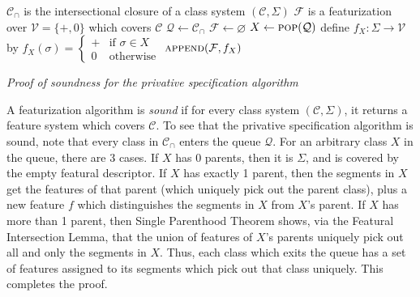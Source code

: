 \documentclass[11pt, oneside]{article}   	%
\begin{document}
\noindent \begin{algorithmic}
    \REQUIRE $\mathcal C_\cap$ is the intersectional closure of a class system $(\mathcal C, \Sigma)$
    \ENSURE $\mathcal F$ is a featurization over $\mathcal V = \{ +, 0 \}$ which covers $\mathcal C$
    \STATE
    \STATE $\mathcal Q \leftarrow \mathcal C_\cap$
    \STATE $\mathcal F \leftarrow \varnothing$
    \STATE
        \STATE $X \leftarrow \textsc{pop}(\mathcal Q)$
            \STATE define $f_X : \Sigma \rightarrow \mathcal V$ by $f_X(\sigma) = \begin{cases}
                + & \mbox{if } \sigma \in X \\
                0 & \mbox{otherwise}
                \end{cases} $
            \STATE $\textsc{append}(\mathcal F, f_X)$
        \ENDIF
    \ENDWHILE
\end{algorithmic}

\vspace{\baselineskip} \noindent \textit{Proof of soundness for the privative specification algorithm}

A featurization algorithm is \textit{sound} if for every class system $(\mathcal C, \Sigma)$, it returns a feature system which covers $\mathcal C$. To see that the privative specification algorithm is sound, note that every class in $\mathcal C_\cap$ enters the queue $\mathcal Q$. For an arbitrary class $X$ in the queue, there are 3 cases. If $X$ has 0 parents, then it is $\Sigma$, and is covered by the empty featural descriptor. If $X$ has exactly 1 parent, then the segments in $X$ get the features of that parent (which uniquely pick out the parent class), plus a new feature $f$ which distinguishes the segments in $X$ from $X$'s parent. If $X$ has more than 1 parent, then Single Parenthood Theorem shows, via the Featural Intersection Lemma, that the union of features of $X$'s parents uniquely pick out all and only the segments in $X$. Thus, each class which exits the queue has a set of features assigned to its segments which pick out that class uniquely. This completes the proof.
\end{document}
